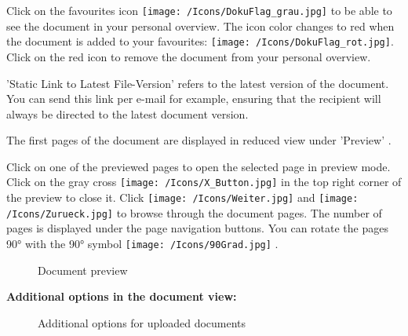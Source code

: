 Click on the favourites icon \texttt{[image: /Icons/DokuFlag\_grau.jpg]}  to be able to see the document in your personal overview. The icon color changes to red when the document is added to your favourites: \texttt{[image: /Icons/DokuFlag\_rot.jpg]}. Click on the red icon to remove the document from your personal overview. \newline

'Static Link to Latest File-Version'  refers to the latest version of the document. You can send this link per e-mail for example, ensuring that the recipient will always be directed to the latest document version.

The first pages of the document are displayed in reduced view under 'Preview' .

\vspace{\baselineskip}

Click on one of the previewed pages  to open the selected page in preview mode. Click on the gray cross \texttt{[image: /Icons/X\_Button.jpg]}  in the top right corner of the preview to close it. Click \texttt{[image: /Icons/Weiter.jpg]} and \texttt{[image: /Icons/Zurueck.jpg]}  to browse through the document pages. The number of pages  is displayed under the page navigation buttons. You can rotate the pages 90° with the 90° symbol \texttt{[image: /Icons/90Grad.jpg]} .

\begin{figure}[H]
\caption{Document preview}
\end{figure}

\textbf{Additional options in the document view:}

\begin{figure}[H]
\caption{Additional options for uploaded documents}
\end{figure}

